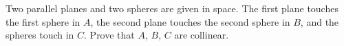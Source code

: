 Two parallel planes and two spheres are given in space. The first plane touches the first sphere in $A$, the second plane touches the second sphere in $B$, and the spheres touch in $C$. Prove that $A$, $B$, $C$ are collinear.
